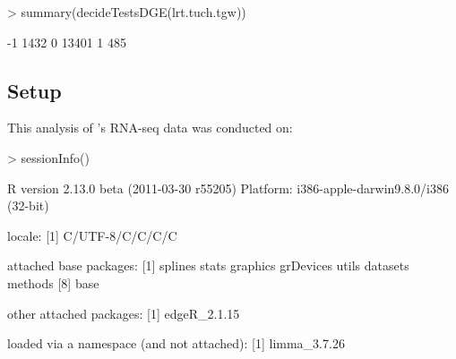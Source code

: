 \begin{Schunk}
\begin{Sinput}
> summary(decideTestsDGE(lrt.tuch.tgw))
\end{Sinput}
\begin{Soutput}
   [,1] 
-1  1432
0  13401
1    485
\end{Soutput}
\end{Schunk}


\subsection{Setup}
This analysis of \citet{Tuch:2010p457}'s RNA-seq data was conducted on:
\begin{Schunk}
\begin{Sinput}
> sessionInfo()
\end{Sinput}
\begin{Soutput}
R version 2.13.0 beta (2011-03-30 r55205)
Platform: i386-apple-darwin9.8.0/i386 (32-bit)

locale:
[1] C/UTF-8/C/C/C/C

attached base packages:
[1] splines   stats     graphics  grDevices utils     datasets  methods  
[8] base     

other attached packages:
[1] edgeR_2.1.15

loaded via a namespace (and not attached):
[1] limma_3.7.26
\end{Soutput}
\end{Schunk}


